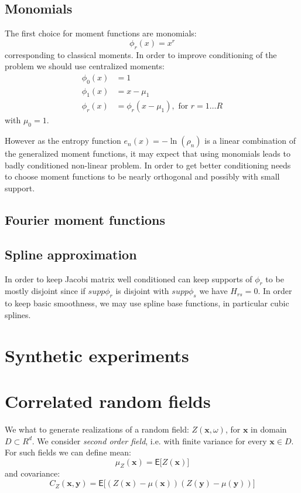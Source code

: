 \documentclass{article}
\def\vc#1{\mathbf{\boldsymbol{#1}}}     %
\def \E{{\mathsf E}}
\begin{document}
\subsection{Monomials}
The first choice for moment functions are monomials:
\[
    \phi_r(x) = x^r
\]
corresponding to classical moments.
In order to improve conditioning of the problem we should use centralized moments:
\begin{align}
    \phi_0(x) &= 1\\
    \phi_1(x) &= x - \mu_1\\
    \phi_r(x) &= \phi_r(x - \mu_1), \text{ for }r=1\dots R
\end{align}
with $\mu_0 = 1$.

However as the entropy function $e_n(x) = -\ln(\rho_n)$ is a linear combination of the generalized moment functions, it may expect that using monomials leads to badly conditioned non-linear problem. In order to 
get better conditioning needs to choose moment functions to be nearly orthogonal and possibly with small support.

\subsection{Fourier moment functions}


\subsection{Spline approximation}
In order to keep Jacobi matrix well conditioned can keep supports of $\phi_r$ to be mostly disjoint since if $supp \phi_r$ is disjoint with $supp \phi_s$ we have $H_{rs} = 0$.
In order to keep basic smoothness, we may use spline base functions, in particular cubic splines.



\section{Synthetic experiments}
\section{Correlated random fields}
We what to generate realizations of a random field: $Z(\vc x, \omega)$, for $\vc x$ in domain $D \subset R^d$. We consider {\it second order field}, i.e. with finite variance for every $\vc x\in D$. For such fields we can define mean:
\[
    \mu_Z(\vc x) = \E\big[ Z(\vc x) \big]
\]
and covariance:
\[
    C_Z(\vc x, \vc y) = \E\big[ (Z(\vc x) - \mu(\vc x))(Z(\vc y) - \mu(\vc y)) \big]
\]
\end{document}
